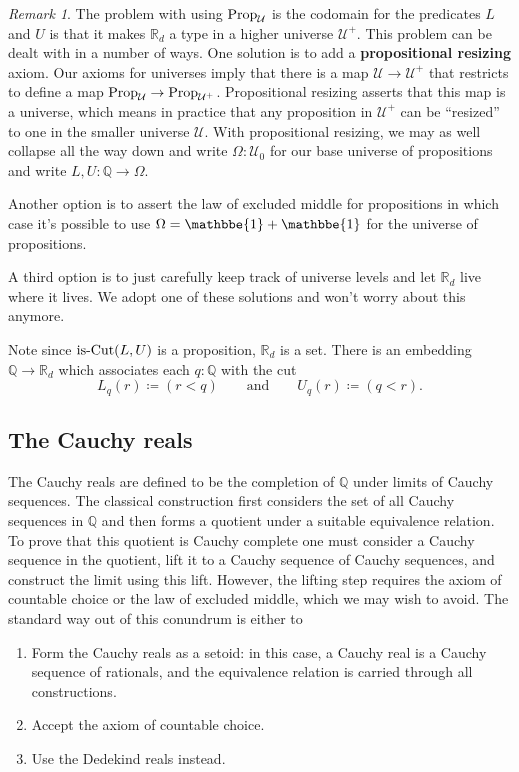 \documentclass{amsart}
\theoremstyle{theorem}
\theoremstyle{definition}
\theoremstyle{remark}
\newtheorem*{rmk}{Remark}
\newcommand{\0}{\mathbbe{0}}
\newcommand{\1}{\mathbbe{1}}
\newcommand{\2}{\mathbbe{2}}
\newcommand{\3}{\mathbbe{3}}
\newcommand{\4}{\mathbbe{4}}
\newcommand{\QQ}{\mathbb{Q}}
\newcommand{\RR}{\mathbb{R}}
\newcommand{\type}[1]{{\textup{#1}}}
\newcommand{\UU}{{\mathcal{U}}}
\newcommand{\is}[1]{\type{is-{#1}}}
\newcommand{\Prop}{\type{Prop}_{\UU}}
\begin{document}
\begin{rmk}
The problem with using $\Prop$ is the codomain for the predicates $L$ and $U$ is that it makes $\RR_d$ a type in a higher universe $\UU^+$. This problem can be dealt with in a number of ways. One solution is to add a \textbf{propositional resizing} axiom. Our axioms for universes imply that there is a map $\UU \to \UU^+$ that restricts to define a map $\Prop \to \type{Prop}_{\UU^+}$. Propositional resizing asserts that this map is a universe, which means in practice that any proposition in $\UU^+$ can be ``resized'' to one in the smaller universe $\UU$. With propositional resizing, we may as well collapse all the way down and write $\Omega : \UU_0$ for our base universe of propositions and write $L, U : \QQ \to \Omega$.

Another option is to assert the law of excluded middle for propositions in which case it's possible to use $\Omega = \1 + \1$ for the universe of propositions. 

A third option is to just carefully keep track of universe levels and let $\RR_d$ live where it lives. We adopt one of these solutions and won't worry about this anymore.
\end{rmk}

Note since $\is{Cut}(L,U)$ is a proposition, $\RR_d$ is a set. There is an embedding $\QQ \to \RR_d$ which associates each $q : \QQ$ with the cut
\[ L_q(r) \coloneq (r <q) \qquad \text{and} \qquad U_q(r) \coloneq (q<r).\]

\subsection*{The Cauchy reals}

The Cauchy reals are defined to be the completion of $\QQ$ under limits of Cauchy sequences. The classical construction first considers the set of all Cauchy sequences in $\QQ$ and then forms a quotient under a suitable equivalence relation. To prove that this quotient is Cauchy complete one must consider a Cauchy sequence in the quotient, lift it to a Cauchy sequence of Cauchy sequences, and construct the limit using this lift. However, the lifting step requires the axiom of countable choice or the law of excluded middle, which we may wish to avoid. The standard way out of this conundrum is either to 
\begin{enumerate}
\item Form the Cauchy reals as a setoid: in this case, a Cauchy real is a Cauchy sequence of rationals, and the equivalence relation is carried through all constructions.
\item Accept the axiom of countable choice.
\item Use the Dedekind reals instead.
\end{enumerate}
\end{document}
